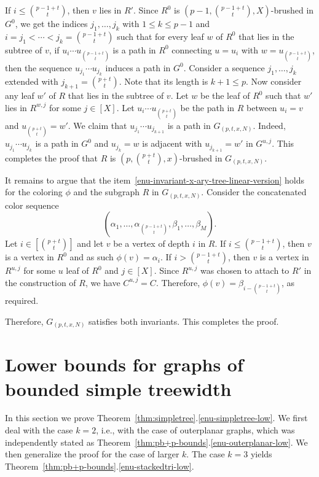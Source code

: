 \documentclass[11pt]{article}
\begin{document}
If $i\leq \binom{p-1+t}{t}$, then $v$ lies in $R'$.
Since $R^0$ is $(p-1,\binom{p-1+t}{t},X)$-brushed in $G^0$, we get the indices $j_1,\ldots,j_k$ with 
$1\leq k\leq p-1$ and $i=j_1 < \cdots < j_k = \binom{p-1+t}{t}$ such that for every leaf $w$ of $R^{0}$ that lies in the subtree of $v$, if $u_{i}\cdots u_{\binom{p-1+t}{t}}$ is a path in $R^0$ connecting $u=u_{i}$ with $w=u_{\binom{p-1+t}{t}}$, then the sequence $u_{j_1}\cdots u_{j_k}$ induces a path in $G^0$.
Consider a sequence $j_1,\ldots,j_k$ extended with $j_{k+1} = \binom{p+t}{t}$. 
Note that its length is $k+1 \leq p$.
Now consider any leaf $w'$ of $R$ that lies in the subtree of $v$. 
Let $w$ be the leaf of $R^0$ such that $w'$ lies in $R^{w,j}$ for some $j\in[X]$. 
Let $u_i\cdots u_{\binom{p+t}{t}}$ be the path in $R$ between $u_i=v$ and $u_{\binom{p+t}{t}}=w'$.
We claim that $u_{j_1}\cdots u_{j_{k+1}}$ is a path in $G_{(p,t,x,N)}$.
Indeed, $u_{j_1}\cdots u_{j_{k}}$ is a path in $G^0$ and $u_{j_k}=w$ is adjacent with $u_{j_{k+1}}=w'$ in $G^{u,j}$.
This completes the proof that $R$ is $\left(p,\binom{p+t}{t},x\right)$-brushed in $G_{(p,t,x,N)}$.

It remains to argue that the item~\eqref{enu-invariant-x-ary-tree-linear-version} holds for the coloring $\phi$ and the subgraph $R$ in $G_{(p,t,x,N)}$.
Consider the concatenated color sequence
\[
\left(\alpha_1,\ldots,\alpha_{\binom{p-1+t}{t}},\beta_1,\ldots,\beta_M\right).
\]
Let $i\in\left[\binom{p+t}{t}\right]$ and let $v$ be a vertex of depth $i$ in $R$.
If $i \leq \binom{p-1+t}{t}$, then $v$ is a vertex in $R^0$ and as such $\phi(v)=\alpha_i$. 
If $i > \binom{p-1+t}{t}$, then $v$ is a vertex in $R^{u,j}$ for some $u$ leaf of $R^0$ and $j\in[X]$. 
Since $R^{u,j}$ was chosen to attach to $R'$ in the construction of $R$, we have $C^{u,j}=C$.
Therefore, $\phi(v) = \beta_{i - \binom{p-1+t}{t}}$, as required.

Therefore, $G_{(p,t,x,N)}$ satisfies both invariants.
This completes the proof.

\section{Lower bounds for graphs of bounded simple treewidth}
\label{sec-lower-bounds-subplanars}

In this section we prove Theorem~\ref{thm:simpletree}.\ref{enu-simpletree-low}.
We first deal with the case $k=2$, i.e., with the case of outerplanar graphs,
which was independently stated as Theorem~\ref{thm:pb+p-bounds}.\ref{enu-outerplanar-low}. 
We then generalize the proof for the case of larger $k$. The case $k=3$
yields Theorem~\ref{thm:pb+p-bounds}.\ref{enu-stackedtri-low}.
\end{document}
